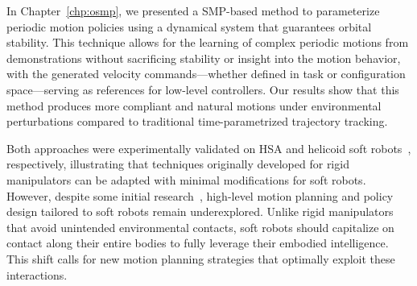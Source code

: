 In Chapter~\ref{chp:osmp}, we presented a \gls{SMP}-based method to parameterize periodic motion policies using a dynamical system that guarantees orbital stability. This technique allows for the learning of complex periodic motions from demonstrations without sacrificing stability or insight into the motion behavior, with the generated velocity commands—whether defined in task or configuration space—serving as references for low-level controllers. Our results show that this method produces more compliant and natural motions under environmental perturbations compared to traditional time-parametrized trajectory tracking.

Both approaches were experimentally validated on \gls{HSA} and helicoid soft robots~\citep{guan2023trimmed}, respectively, illustrating that techniques originally developed for rigid manipulators can be adapted with minimal modifications for soft robots. However, despite some initial research~\citep{goldman2014compliant, greer2020robust, selvaggio2020obstacle, rao2024towards, rao2024tendon}, high-level motion planning and policy design tailored to soft robots remain underexplored. Unlike rigid manipulators that avoid unintended environmental contacts, soft robots should capitalize on contact along their entire bodies to fully leverage their embodied intelligence. This shift calls for new motion planning strategies that optimally exploit these interactions.